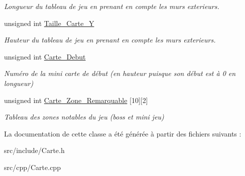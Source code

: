 \begin{DoxyCompactItemize}
\begin{DoxyCompactList}\small\item\em Longueur du tableau de jeu en prenant en compte les murs exterieurs. \end{DoxyCompactList}\item 
\hypertarget{classCarte_afac40958c8d8bb7e9ac1c328c384262c}{unsigned int \hyperlink{classCarte_afac40958c8d8bb7e9ac1c328c384262c}{Taille\+\_\+\+Carte\+\_\+\+Y}}\label{classCarte_afac40958c8d8bb7e9ac1c328c384262c}

\begin{DoxyCompactList}\small\item\em Hauteur du tableau de jeu en prenant en compte les murs exterieurs. \end{DoxyCompactList}\item 
\hypertarget{classCarte_a6842fb7279b10ca6304d46d5826e0d77}{unsigned int \hyperlink{classCarte_a6842fb7279b10ca6304d46d5826e0d77}{Carte\+\_\+\+Debut}}\label{classCarte_a6842fb7279b10ca6304d46d5826e0d77}

\begin{DoxyCompactList}\small\item\em Numéro de la mini carte de début (en hauteur puisque son début est à 0 en longueur) \end{DoxyCompactList}\item 
\hypertarget{classCarte_aee0d9ac76de161ae4c53a6572932cbea}{unsigned int \hyperlink{classCarte_aee0d9ac76de161ae4c53a6572932cbea}{Carte\+\_\+\+Zone\+\_\+\+Remarquable} \mbox{[}10\mbox{]}\mbox{[}2\mbox{]}}\label{classCarte_aee0d9ac76de161ae4c53a6572932cbea}

\begin{DoxyCompactList}\small\item\em Tableau des zones notables du jeu (boss et mini jeu) \end{DoxyCompactList}\end{DoxyCompactItemize}


La documentation de cette classe a été générée à partir des fichiers suivants \+:\begin{DoxyCompactItemize}
\item 
src/include/Carte.\+h\item 
src/cpp/Carte.\+cpp\end{DoxyCompactItemize}
